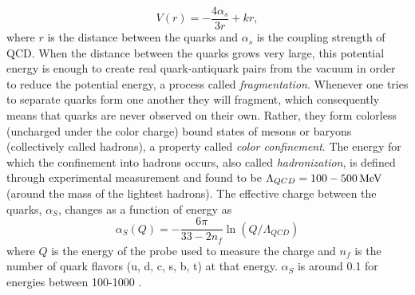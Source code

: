 \begin{equation}
  V(r)=-\frac{4\alpha_s}{3r}+kr,
\end{equation} 
where $r$ is the distance between the quarks and $\alpha_s$ is the coupling strength of QCD.
When the distance between the quarks grows very large, this potential energy is enough to create real quark-antiquark pairs from the vacuum in order to reduce the potential energy, a process called \emph{fragmentation}. Whenever one tries to separate quarks form one another they will fragment, which consequently means that quarks are never observed on their own. Rather, they form colorless (uncharged under the color charge) bound states of mesons or baryons (collectively called hadrons), a property called \emph{color confinement}. The energy for which the confinement into hadrons occurs, also called \emph{hadronization}, is defined through experimental measurement and found to be $\Lambda_{QCD}=100-500 \,\text{Me\hspace{-.08em}V}$ (around the mass of the lightest hadrons). The effective charge between the quarks, $\alpha_S$, changes as a function of energy as
 \begin{equation}
   \alpha_S(Q)=-\frac{6\pi}{33-2n_f}\ln(Q/\Lambda_{QCD})
 \end{equation}
where $Q$ is the energy of the probe used to measure the charge and $n_f$ is the number of quark flavors (u, d, c, s, b, t) at that energy. $\alpha_S$ is around 0.1 for energies between 100-1000 \GeV.

